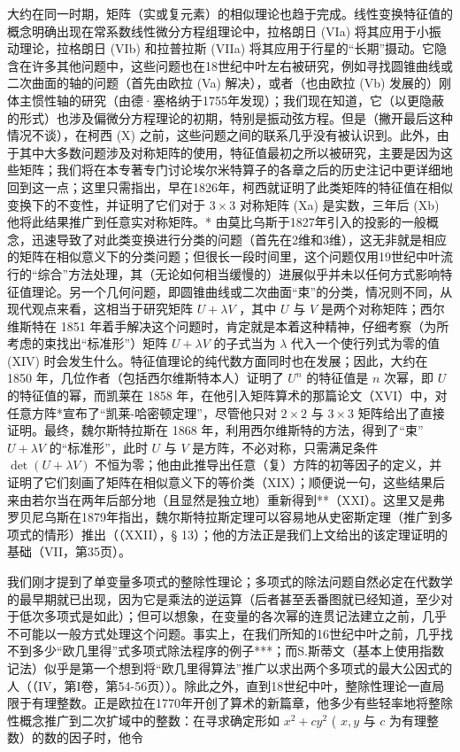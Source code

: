 大约在同一时期，矩阵（实或复元素）的相似理论也趋于完成。线性变换特征值的概念明确出现在常系数线性微分方程组理论中，拉格朗日 (VIa) 将其应用于小振动理论，拉格朗日 (VIb) 和拉普拉斯 (VIIa) 将其应用于行星的“长期”摄动。它隐含在许多其他问题中，这些问题也在18世纪中叶左右被研究，例如寻找圆锥曲线或二次曲面的轴的问题（首先由欧拉 (Va) 解决），或者（也由欧拉 (Vb) 发展的）刚体主惯性轴的研究（由德·塞格纳于1755年发现）；我们现在知道，它（以更隐蔽的形式）也涉及偏微分方程理论的初期，特别是振动弦方程。但是（撇开最后这种情况不谈），在柯西 (X) 之前，这些问题之间的联系几乎没有被认识到。此外，由于其中大多数问题涉及对称矩阵的使用，特征值最初之所以被研究，主要是因为这些矩阵；我们将在本专著专门讨论埃尔米特算子的各章之后的历史注记中更详细地回到这一点；这里只需指出，早在1826年，柯西就证明了此类矩阵的特征值在相似变换下的不变性，并证明了它们对于 \(3 \times 3\) 对称矩阵 (Xa) 是实数，三年后 (Xb) 他将此结果推广到任意实对称矩阵。* 由莫比乌斯于1827年引入的投影的一般概念，迅速导致了对此类变换进行分类的问题（首先在2维和3维），这无非就是相应的矩阵在相似意义下的分类问题；但很长一段时间里，这个问题仅用19世纪中叶流行的“综合”方法处理，其（无论如何相当缓慢的）进展似乎并未以任何方式影响特征值理论。另一个几何问题，即圆锥曲线或二次曲面“束”的分类，情况则不同，从现代观点来看，这相当于研究矩阵 \(U + \lambda V\) ，其中 \(U\) 与 \(V\) 是两个对称矩阵；西尔维斯特在 1851 年着手解决这个问题时，肯定就是本着这种精神，仔细考察（为所考虑的束找出“标准形”）矩阵 \(U + \lambda V\) 的子式当为 \(\lambda\) 代入一个使行列式为零的值 (XIV) 时会发生什么。特征值理论的纯代数方面同时也在发展；因此，大约在 1850 年，几位作者（包括西尔维斯特本人）证明了 \(U^n\) 的特征值是 \(n\) 次幂，即 \(U\) 的特征值的幂，而凯莱在 1858 年，在他引入矩阵算术的那篇论文（XVI）中，对任意方阵*宣布了“凯莱-哈密顿定理”，尽管他只对 \(2 \times 2\) 与 \(3 \times 3\) 矩阵给出了直接证明。最终，魏尔斯特拉斯在 1868 年，利用西尔维斯特的方法，得到了“束” \(U + \lambda V\) 的“标准形”，此时 \(U\) 与 \(V\) 是方阵，不必对称，只需满足条件 \(\det(U + \lambda V)\) 不恒为零；他由此推导出任意（复）方阵的初等因子的定义，并证明了它们刻画了矩阵在相似意义下的等价类（XIX）；顺便说一句，这些结果后来由若尔当在两年后部分地（且显然是独立地）重新得到**（XXI）。这里又是弗罗贝尼乌斯在1879年指出，魏尔斯特拉斯定理可以容易地从史密斯定理（推广到多项式的情形）推出（（XXII），§ 13）；他的方法正是我们上文给出的该定理证明的基础（VII，第35页）。

我们刚才提到了单变量多项式的整除性理论；多项式的除法问题自然必定在代数学的最早期就已出现，因为它是乘法的逆运算（后者甚至丢番图就已经知道，至少对于低次多项式是如此）；但可以想象，在变量的各次幂的连贯记法建立之前，几乎不可能以一般方式处理这个问题。事实上，在我们所知的16世纪中叶之前，几乎找不到多少“欧几里得”式多项式除法程序的例子***；而S.斯蒂文（基本上使用指数记法）似乎是第一个想到将“欧几里得算法”推广以求出两个多项式的最大公因式的人（（IV，第I卷，第54-56页））。除此之外，直到18世纪中叶，整除性理论一直局限于有理整数。正是欧拉在1770年开创了算术的新篇章，他多少有些轻率地将整除性概念推广到二次扩域中的整数：在寻求确定形如 \(x^{2} + cy^{2}\) ( \(x, y\) 与 \(c\) 为有理整数）的数的因子时，他令

